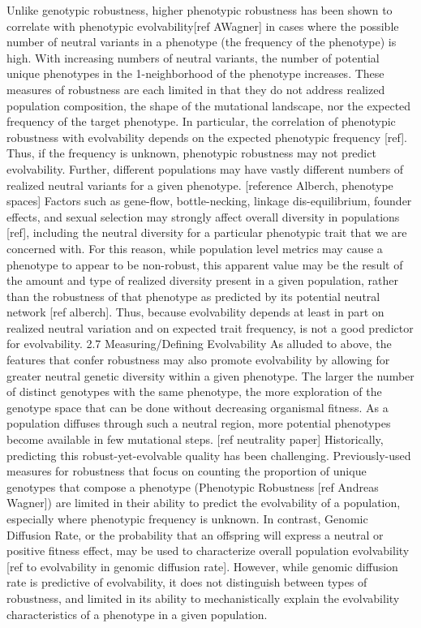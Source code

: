 Unlike genotypic robustness, higher phenotypic robustness has been shown to correlate with phenotypic evolvability[ref AWagner] in cases where the possible number of neutral variants in a phenotype (the frequency of the phenotype) is high. With increasing numbers of neutral variants, the number of potential unique phenotypes in the 1-neighborhood of the phenotype increases.
These measures of robustness are each limited in that they do not address realized population composition, the shape of the mutational landscape, nor the expected frequency of the target phenotype. In particular, the correlation of phenotypic robustness with evolvability depends on the expected phenotypic frequency [ref]. Thus, if the frequency is unknown, phenotypic robustness may not predict evolvability.
Further, different populations may have vastly different numbers of realized neutral variants for a given phenotype. [reference Alberch, phenotype spaces] Factors such as gene-flow, bottle-necking, linkage dis-equilibrium, founder effects, and sexual selection may strongly affect overall diversity in populations [ref], including the neutral diversity for a particular phenotypic trait that we are concerned with.
For this reason, while population level metrics may cause a phenotype to appear to be non-robust, this apparent value may be the result of the amount and type of realized diversity present in a given population, rather than the robustness of that phenotype as predicted by its potential neutral network [ref alberch]. Thus, because evolvability depends at least in part on realized neutral variation and on expected trait frequency,  is not a good predictor for evolvability.
2.7 Measuring/Defining Evolvability
As alluded to above, the features that confer robustness may also promote evolvability by allowing for greater neutral genetic diversity within a given phenotype. The larger the number of distinct genotypes with the same phenotype, the more exploration of the genotype space that can be done without decreasing organismal fitness. As a population diffuses through such a neutral region, more potential phenotypes become available in few mutational steps. [ref neutrality paper]
Historically, predicting this robust-yet-evolvable quality has been challenging. Previously-used measures for robustness that focus on counting the proportion of unique genotypes that compose a phenotype (Phenotypic Robustness [ref Andreas Wagner]) are limited in their ability to predict the evolvability of a population, especially where phenotypic frequency is unknown. 
In contrast, Genomic Diffusion Rate, or the probability that an offspring will express a neutral or positive fitness effect, may be used to characterize overall population evolvability [ref to evolvability in genomic diffusion rate]. However, while genomic diffusion rate is predictive of evolvability, it does not distinguish between types of robustness, and limited in its ability to mechanistically explain the evolvability characteristics of a phenotype in a given population. 

